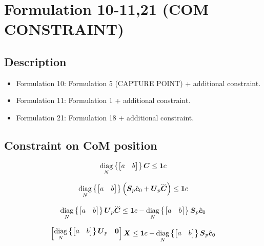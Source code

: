 \section{Formulation 10-11,21 (COM CONSTRAINT)}


\subsection{Description}
\begin{itemize}
    \item Formulation 10: Formulation 5 (CAPTURE POINT) + additional constraint.
    \item Formulation 11: Formulation 1 + additional constraint.
    \item Formulation 21: Formulation 18 + additional constraint.
\end{itemize}



\subsection{Constraint on CoM position}

\begin{equation*}
    \underset{N}{\operatorname{diag}}\left\{\begin{bmatrix} a & b \end{bmatrix}\right\} \mbox{\boldmath $C$}  \le  \mbox{\boldmath $1$} c
\end{equation*}

\begin{equation*}
    \diag{N}{\begin{bmatrix} a & b \end{bmatrix}}
    \left(
        \M{S}_{p} \cstate_0 + \M{U}_{p} \cJerk
    \right)
    \le
    \M{1} c
\end{equation*}


\begin{equation*}
    \diag{N}{\begin{bmatrix} a & b \end{bmatrix}}
    \M{U}_{p} \cJerk
    \le
    \M{1} c 
    -
    \diag{N}{\begin{bmatrix} a & b \end{bmatrix}} \M{S}_{p} \cstate_0
\end{equation*}


\begin{equation*}
    \begin{bmatrix}
        \underset{N}{\operatorname{diag}}\left\{\begin{bmatrix} a & b \end{bmatrix}\right\} \mbox{\boldmath $U$}_{p}     &   \mbox{\boldmath $0$} 
    \end{bmatrix}
    \mbox{\boldmath $X$}
    \le
    \mbox{\boldmath $1$} c 
    -
    \underset{N}{\operatorname{diag}}\left\{\begin{bmatrix} a & b \end{bmatrix}\right\} \mbox{\boldmath $S$}_{p} \hat{\mbox{\boldmath $c$}}_0
\end{equation*}
